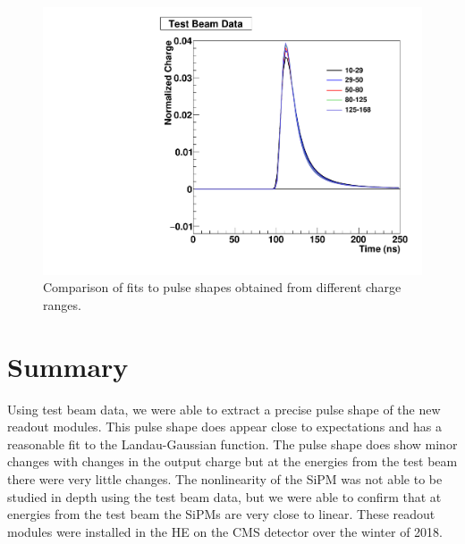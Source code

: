 \begin{figure}
\centering
\includegraphics[width=0.8\linewidth]{Figures/Overlap.pdf}
\caption{Comparison of fits to pulse shapes obtained from different charge ranges.}
\label{fig:Overlap}
\end{figure}


\section{Summary}

Using test beam data, we were able to extract a precise pulse shape of the new readout modules. This pulse shape does appear close to expectations and has a reasonable fit to the Landau-Gaussian function. The pulse shape does show minor changes with changes in the output charge but at the energies from the test beam there were very little changes. The nonlinearity of the SiPM was not able to be studied in depth using the test beam data, but we were able to confirm that at energies from the test beam the SiPMs are very close to linear. These readout modules were installed in the HE on the CMS detector over the winter of 2018. 

